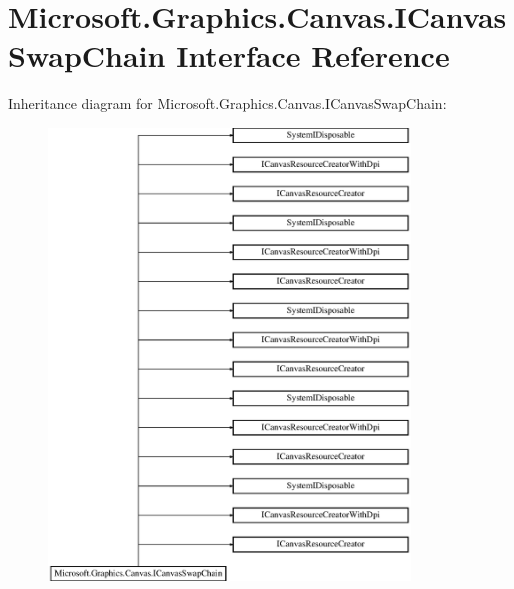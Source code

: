 \hypertarget{interface_microsoft_1_1_graphics_1_1_canvas_1_1_i_canvas_swap_chain}{}\section{Microsoft.\+Graphics.\+Canvas.\+I\+Canvas\+Swap\+Chain Interface Reference}
\label{interface_microsoft_1_1_graphics_1_1_canvas_1_1_i_canvas_swap_chain}
Inheritance diagram for Microsoft.\+Graphics.\+Canvas.\+I\+Canvas\+Swap\+Chain\+:\begin{figure}[H]
\begin{center}
\leavevmode
\includegraphics[height=12.000000cm]{interface_microsoft_1_1_graphics_1_1_canvas_1_1_i_canvas_swap_chain}
\end{center}
\end{figure}
